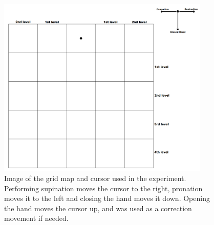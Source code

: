 \begin{figure}[H]                 
	\includegraphics[width=0.9\textwidth]{figures/gridmap2}  
	\caption{Image of the grid map and cursor used in the experiment. Performing supination moves the cursor to the right, pronation moves it to the left and closing the hand moves it down. Opening the hand moves the cursor up, and was used as a correction movement if needed.}
	\label{fig:meth:gridmap} 
\end{figure}

